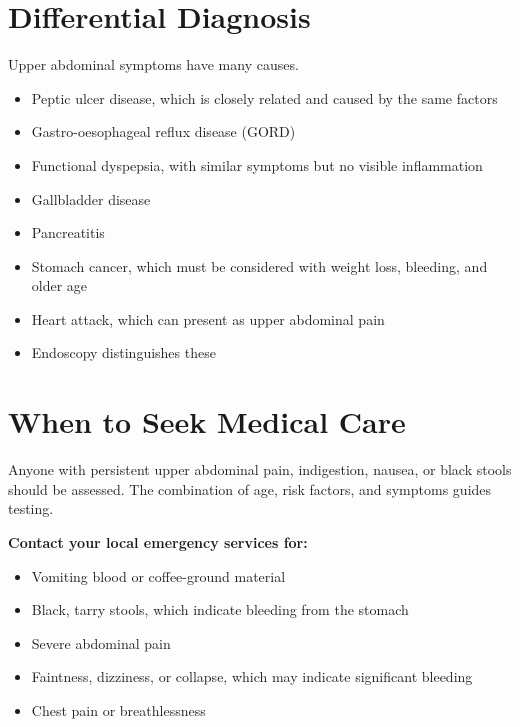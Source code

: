 \section*{Differential Diagnosis}
Upper abdominal symptoms have many causes.
\begin{itemize}
    \item Peptic ulcer disease, which is closely related and caused by the same factors
    \item Gastro-oesophageal reflux disease (GORD)
    \item Functional dyspepsia, with similar symptoms but no visible inflammation
    \item Gallbladder disease
    \item Pancreatitis
    \item Stomach cancer, which must be considered with weight loss, bleeding, and older age
    \item Heart attack, which can present as upper abdominal pain
    \item Endoscopy distinguishes these
\end{itemize}

\section*{When to Seek Medical Care}
Anyone with persistent upper abdominal pain, indigestion, nausea, or black stools should be assessed. The combination of age, risk factors, and symptoms guides testing.

\textbf{Contact your local emergency services for:}
\begin{itemize}
    \item Vomiting blood or coffee-ground material
    \item Black, tarry stools, which indicate bleeding from the stomach
    \item Severe abdominal pain
    \item Faintness, dizziness, or collapse, which may indicate significant bleeding
    \item Chest pain or breathlessness
\end{itemize}

